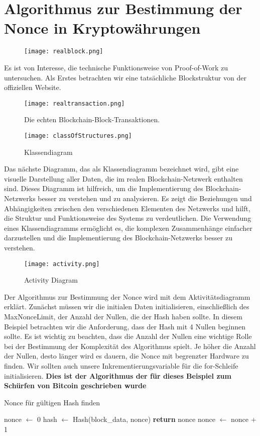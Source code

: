 \section[Praktische Anwendung der Proof-Of-Work-Methode]{Algorithmus zur Bestimmung der Nonce in Kryptowährungen}
\begin{figure}[H]
	\texttt{[image: realblock.png]}
	\small{ \cite{five_image} }
\end{figure}
Es ist von Interesse, die technische Funktionsweise von Proof-of-Work zu untersuchen. Als Erstes betrachten wir eine tatsächliche Blockstruktur von der offiziellen Website.
\begin{figure}[H]
	\texttt{[image: realtransaction.png]}
	\caption{Die echten Blockchain-Block-Transaktionen.}
	\small{ \cite{five_image} }
\end{figure}
\begin{figure}[H]
	\centering
	\texttt{[image: classOfStructures.png]}
	\caption{Klassendiagram}
\end{figure}
Das nächste Diagramm, das als Klassendiagramm bezeichnet wird, gibt eine visuelle Darstellung aller Daten, die im realen Blockchain-Netzwerk enthalten sind. Dieses Diagramm ist hilfreich, um die Implementierung des Blockchain-Netzwerks besser zu verstehen und zu analysieren. Es zeigt die Beziehungen und Abhängigkeiten zwischen den verschiedenen Elementen des Netzwerks und hilft, die Struktur und Funktionsweise des Systems zu verdeutlichen. Die Verwendung eines Klassendiagramms ermöglicht es, die komplexen Zusammenhänge einfacher darzustellen und die Implementierung des Blockchain-Netzwerks besser zu verstehen.
\newpage
\begin{figure}[H]
	\centering
	\texttt{[image: activity.png]}
	\caption{Activity Diagram}
\end{figure}
Der Algorithmus zur Bestimmung der Nonce wird mit dem Aktivitätsdiagramm erklärt. Zunächst müssen wir die initialen Daten initialisieren, einschließlich des MaxNonceLimit, der Anzahl der Nullen, die der Hash haben sollte. In diesem Beispiel betrachten wir die Anforderung, dass der Hash mit 4 Nullen beginnen sollte. Es ist wichtig zu beachten, dass die Anzahl der Nullen eine wichtige Rolle bei der Bestimmung der Komplexität des Algorithmus spielt. Je höher die Anzahl der Nullen, desto länger wird es dauern, die Nonce mit begrenzter Hardware zu finden. Wir sollten auch unsere Inkrementierungsvariable für die for-Schleife initialisieren.
\textbf{Dies ist der Algorithmus \textcommabelow der für dieses Beispiel zum Schürfen von Bitcoin geschrieben wurde} \\
\begin{algorithm}
	\caption{Nonce für gültigen Hash finden}
	\label{alg:nonce_find}
	
	\begin{algorithmic}[1]
		\State nonce $\gets$ 0
		\Repeat
		\State hash $\gets$ Hash(block\_data, nonce)
		\State \textbf{return} nonce
		\EndIf
		\State nonce $\gets$ nonce + 1
	\end{algorithmic}
\end{algorithm}

